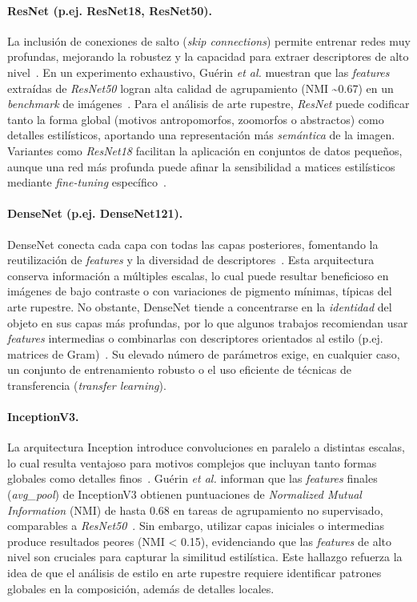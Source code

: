 \paragraph{ResNet (p.ej. ResNet18, ResNet50).}
La inclusión de conexiones de salto (\textit{skip connections}) permite entrenar redes muy profundas, mejorando la robustez y la capacidad para extraer descriptores de alto nivel~\cite{guerin2018}.
En un experimento exhaustivo, Guérin \textit{et al.} muestran que las \textit{features} extraídas de \textit{ResNet50} logran alta calidad de agrupamiento (NMI \textasciitilde 0.67) en un \textit{benchmark} de imágenes~\cite{guerin2018}.
Para el análisis de arte rupestre, \textit{ResNet} puede codificar tanto la forma global (motivos antropomorfos, zoomorfos o abstractos) como detalles estilísticos, aportando una representación más \textit{semántica} de la imagen.
Variantes como \textit{ResNet18} facilitan la aplicación en conjuntos de datos pequeños, aunque una red más profunda puede afinar la sensibilidad a matices estilísticos mediante \textit{fine-tuning} específico~\cite{gairola2020}.

\paragraph{DenseNet (p.ej. DenseNet121).}
DenseNet conecta cada capa con todas las capas posteriores, fomentando la reutilización de \textit{features} y la diversidad de descriptores~\cite{dangeti2024}.
Esta arquitectura conserva información a múltiples escalas, lo cual puede resultar beneficioso en imágenes de bajo contraste o con variaciones de pigmento mínimas, típicas del arte rupestre.
No obstante, DenseNet tiende a concentrarse en la \textit{identidad} del objeto en sus capas más profundas, por lo que algunos trabajos recomiendan usar \textit{features} intermedias o combinarlas con descriptores orientados al estilo (p.ej. matrices de Gram)~\cite{dangeti2024}.
Su elevado número de parámetros exige, en cualquier caso, un conjunto de entrenamiento robusto o el uso eficiente de técnicas de transferencia (\textit{transfer learning}).

\paragraph{InceptionV3.}
La arquitectura Inception introduce convoluciones en paralelo a distintas escalas, lo cual resulta ventajoso para motivos complejos que incluyan tanto formas globales como detalles finos~\cite{guerin2018}.
Guérin \textit{et al.} informan que las \textit{features} finales (\textit{avg\_pool}) de InceptionV3 obtienen puntuaciones de \textit{Normalized Mutual Information} (NMI) de hasta 0.68 en tareas de agrupamiento no supervisado, comparables a \textit{ResNet50}~\cite{guerin2018}.
Sin embargo, utilizar capas iniciales o intermedias produce resultados peores (NMI < 0.15), evidenciando que las \textit{features} de alto nivel son cruciales para capturar la similitud estilística.
Este hallazgo refuerza la idea de que el análisis de estilo en arte rupestre requiere identificar patrones globales en la composición, además de detalles locales.


